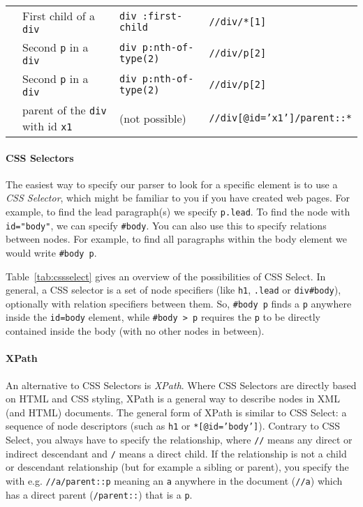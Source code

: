 \begin{table}
{\begin{tabularx}{\textwidth}{llll}
& First child of a \texttt{\small{div}} & \texttt{\small{div :first-child}} & \texttt{\small{//div/*[1]}} \\
& Second \texttt{\small{p}} in a \texttt{\small{div}} & \texttt{\small{div p:nth-of-type(2)}} & \texttt{\small{//div/p[2]}} \\
& Second \texttt{\small{p}} in a \texttt{\small{div}} & \texttt{\small{div p:nth-of-type(2)}} & \texttt{\small{//div/p[2]}} \\
& parent of the \texttt{\small{div}} with id \texttt{\small{x1}} & (not possible) & \texttt{\small{//div[@id='x1']/parent::*}} \\
\bottomrule
  \end{tabularx}}{}
  \end{table}


\paragraph{CSS Selectors} The easiest way to specify our parser to look for a specific element is to use a \emph{CSS Selector},
which might be familiar to you if you have created web pages.
For example, to find the lead paragraph(s) we specify \texttt{\small{p.lead}}.
To find the node with \texttt{\small{id="body"}}, we can specify \texttt{\small{\#body}}.
You can also use this to specify relations between nodes. For example,
to find all paragraphs within the body element we would write \texttt{\small{\#body p}}.

Table~\ref{tab:cssselect} gives an overview of the possibilities of CSS Select.
In general, a CSS selector is a set of node specifiers (like \texttt{\small{h1}}, \texttt{\small{.lead}} or \texttt{\small{div\#body}}),
optionally with relation specifiers between them.
So, \texttt{\small{\#body p}} finds a \texttt{\small{p}} anywhere inside the \texttt{\small{id=body}} element,
while \texttt{\small{\#body > p}} requires the \texttt{\small{p}} to be directly contained inside the body
(with no other nodes in between).

\paragraph{XPath}
An alternative to CSS Selectors is \emph{XPath}.
Where CSS Selectors are directly based on HTML and CSS styling,
XPath is a general way to describe nodes in XML (and HTML) documents.
The general form of XPath is similar to CSS Select:
a sequence of node descriptors (such as \texttt{\small{h1}} or \texttt{\small{*[@id='body']}}).
Contrary to CSS Select, you always have to specify the relationship, where
\texttt{\small{//}} means any direct or indirect descendant and \texttt{\small{/}} means a direct child.
If the relationship is not a child or descendant relationship (but for example a sibling or parent),
you specify the  with e.g. \texttt{\small{//a/parent::p}} meaning an \texttt{\small{a}} anywhere in the document (\texttt{\small{//a}}) which has a direct parent (\texttt{\small{/parent::}}) that is a \texttt{\small{p}}.

